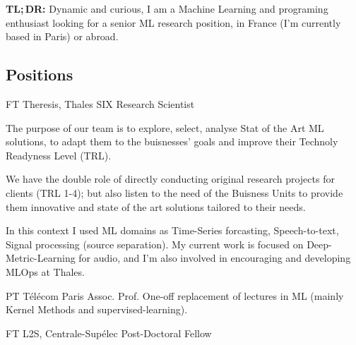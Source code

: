 \documentclass[10pt]{article} %
\begin{document}
\vspace{-1.75cm}
\begin{center}
    \textbf{TL;\,DR:} Dynamic and curious, I am a Machine Learning and
    programing enthusiast looking for a senior ML research position, in France
    (I'm currently based in Paris) or abroad.
\end{center}
\vspace{-3.5mm}
\begin{paracol}{2}
%
%
\section{Positions}
%
%
%
%
%
{FT} %
{Theresis, Thales SIX} %
{Research Scientist} %
{The purpose of our team is to explore, select, analyse Stat of the Art
  ML solutions, to adapt them to the buisnesses' goals and improve their Technoly
  Readyness Level (TRL). \par
  We have the double role of directly conducting original research
  projects for clients (TRL 1-4); but also listen to the need of the
  Buisness Units to provide them innovative and state of the art
  solutions tailored to their needs.  \par
  In this context I used ML domains as Time-Series forcasting,
  Speech-to-text, Signal processing (source separation). My current work
  is focused on Deep-Metric-Learning for audio, and I'm also involved in
  encouraging and developing MLOps at Thales.}\par %
{PT} %
{T\'el\'ecom Paris} %
{Assoc. Prof.} %
{One-off replacement of lectures in ML (mainly Kernel Methods and
  supervised-learning).}\par
{} %
{FT} %
{L2S, Centrale-Sup\'elec} %
{Post-Doctoral Fellow} %

\end{paracol}
\end{document}

